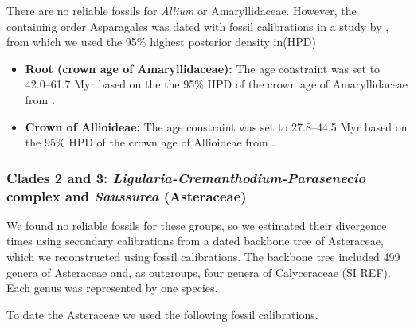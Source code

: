 \documentclass[10pt]{article}
\begin{document}
\noindent There are no reliable fossils for \textit{Allium} or
Amaryllidaceae. However, the containing order Asparagales was dated
with fossil calibrations in a study by \citet{Chen2013}, from which we
used the 95\% highest posterior density in(HPD)

\begin{itemize}

\item \textbf{Root (crown age of Amaryllidaceae):} The age constraint
  was set to 42.0--61.7 Myr based on the the 95\% HPD of the crown age
  of Amaryllidaceae from \cite{Chen2013}.

\item \textbf{Crown of Allioideae:} The age constraint was set to
  27.8--44.5 Myr based on the 95\% HPD of the crown age of Allioideae
  from \cite{Chen2013}.

\end{itemize}

\subsubsection*{Clades 2 and 3:
  \textit{Ligularia-Cremanthodium-Parasenecio} complex and
  \textit{Saussurea} (Asteraceae)}

We found no reliable fossils for these groups, so we estimated their
divergence times using secondary calibrations from a dated backbone
tree of Asteraceae, which we reconstructed using fossil
calibrations. The backbone tree included 499 genera of Asteraceae and,
as outgroups, four genera of Calyceraceae (SI REF). Each genus was
represented by one species.

To date the Asteraceae we used the following fossil calibrations.

\end{document}
